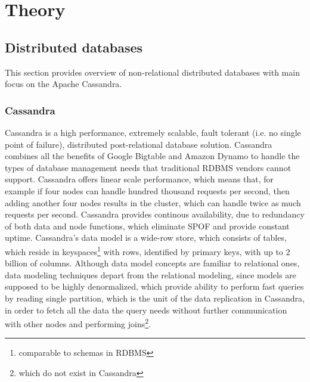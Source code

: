 
\chapter{Theory}\label{chapter:theory}

\section{Distributed databases}\label{sec:theory:distDbs}
This section provides overview of non-relational distributed databases with main focus on the Apache Cassandra.


\subsection{Cassandra}
Cassandra \cite{CassandraApacheDocs} \cite{CassandraDataStaxDocs} is a high performance, extremely scalable, fault tolerant (i.e. no single point of failure), distributed post-relational database solution. Cassandra combines all the benefits of Google Bigtable \cite{chang2008bigtable} and Amazon Dynamo \cite{decandia2007dynamo} to handle the types of database management needs that traditional RDBMS vendors cannot support. 
Cassandra offers linear scale performance, which means that, for example if four nodes can handle hundred thousand requests per second, then adding another four nodes results in the cluster, which can handle twice as much requests per second. Cassandra provides continous availability, due to redundancy of both data and node functions, which eliminate SPOF and provide constant uptime. Cassandra's data model is a wide-row store, which consists of tables, which reside in keyspaces\footnote{comparable to schemas in RDBMS} with rows, identified by primary keys, with up to 2 billion of columns. Although data model concepts are familiar to relational ones, data modeling techniques depart from the relational modeling, since models are supposed to be highly denormalized, which provide ability to perform fast queries by reading single partition, which is the unit of the data replication in Cassandra, in order to fetch all the data the query needs without further communication with other nodes and performing joins\footnote{which do not exist in Cassandra}.

